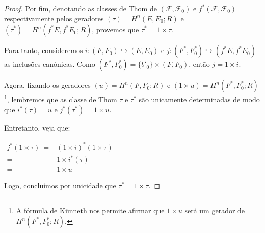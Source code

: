 \documentclass[12pt,oneside]{book} %
\begin{document}
\begin{proof}
	\par Por fim, denotando as classes de Thom de $(\mathcal{F},\mathcal{F}_{0})$ e $f^{*}(\mathcal{F},\mathcal{F}_{0})$ respectivamente pelos geradores $(\tau)=H^{n}(E,E_{0};R)$ e $(\tau^{*})=H^{n}(f^{*}E,f^{*}E_{0};R)$, provemos que $\tau^{*}=1\times\tau$.
	
	\par Para tanto, consideremos $i:(F,F_{0})\hookrightarrow (E,E_{0})$ e $j:(F^{*},F^{*}_{0})\hookrightarrow (f^{*}E,f^{*}E_{0})$ as inclusões canônicas. Como $(F^{*},F^{*}_{0})=\{ b'_{0} \}\times (F,F_{0})$, então $j=1\times i$.
	
	\par Agora, fixando os geradores $(u)=H^{n}(F,F_{0};R)$ e $(1\times u)=H^{n}(F^{*},F^{*}_{0};R)$\footnote{A fórmula de Künneth nos permite afirmar que $1\times u$ será um gerador de $H^{n}(F^{*},F^{*}_{0};R)$.}, lembremos que as classe de Thom $\tau$ e $\tau^{*}$ são unicamente determinadas de modo que $i^{*}(\tau)=u$ e $j^{*}(\tau^{*})=1\times u$.
	
	\par Entretanto, veja que:\newline
	
	$\begin{array}{rl}
		j^{*}(1\times \tau) \ = & (1\times i)^{*}(1\times \tau) \\
		= & 1\times i^{*}(\tau) \\
		= & 1\times u
	\end{array}$ \newline
	
	\par Logo, concluímos por unicidade que $\tau^{*}=1\times \tau$.
	
\end{proof}
\end{document}
